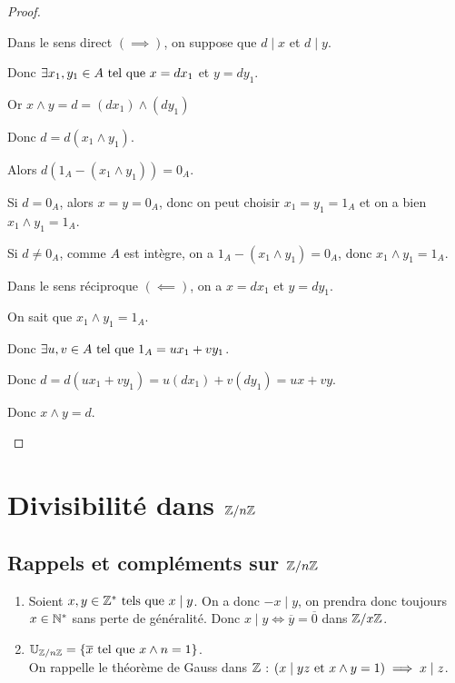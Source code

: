 \documentclass[12pt, a4paper]{report}
\begin{document}
\begin{proof}
    \begin{outline}
    \1 Dans le sens direct $(\implies)$, on suppose que $d\mid x$ et $d\mid y$.

    \2 Donc $\exists x_1,y_1 \in A \text{ tel que } x=dx_1$ et $y=dy_1$.

    \2 Or $x\wedge y = d = (dx_1) \wedge (dy_1)$

    \2 Donc $d = d(x_1 \wedge y_1)$.

    \2 Alors $d(1_A - (x_1 \wedge y_1)) = 0_A$.

    \2 Si $d = 0_A$, alors $x=y=0_A$, donc on peut choisir $x_1=y_1=1_A$ et on a bien $x_1 \wedge y_1 = 1_A$.

    \2 Si $d \neq 0_A$, comme $A$ est intègre, on a $1_A - (x_1 \wedge y_1) = 0_A$, donc $x_1 \wedge y_1 = 1_A$.

    \1 Dans le sens réciproque $(\impliedby)$, on a $x=dx_1$ et $y=dy_1$.

    \2 On sait que $x_1 \wedge y_1 = 1_A$.

    \2 Donc $\exists u,v \in A \text{ tel que } 1_A = u x_1 + v y_1$.

    \2 Donc $d = d(u x_1 + v y_1) = u (dx_1) + v (dy_1) = ux + vy$.

    \2 Donc $x \wedge y = d$.
    \end{outline}
\end{proof}

\chapter{Divisibilité dans $\mathbb{Z}/n\mathbb{Z}$}

\section{Rappels et compléments sur $\mathbb{Z}/n\mathbb{Z}$}

\begin{remark}
    \begin{enumerate}
        \item Soient $x,y \in \mathbb{Z}^* \text{ tels que } x \mid y$. On a donc $-x\mid y$, on prendra donc toujours $x \in \mathbb{N}^*$ sans perte de généralité. Donc $x\mid y \iff \overline{y} = \overline{0}$ dans $\mathbb{Z}/x\mathbb{Z}$.
        \item $\mathbb{U}_{\mathbb{Z}/n\mathbb{Z}} = \{\overline{x} \text{ tel que } x \wedge n = 1\}$.\\On rappelle le théorème de Gauss dans $\mathbb{Z}$ : $(x\mid yz \text{ et } x \wedge y =1)\implies x \mid z$.
    \end{enumerate}
\end{remark}
\end{document}
